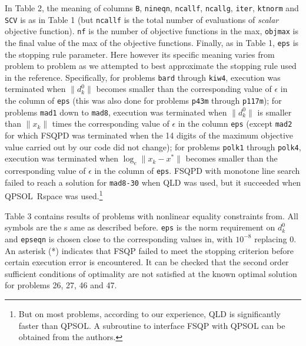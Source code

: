 In Table 2, the meaning of columns {\tt B}, {\tt nineqn}, {\tt ncallf}, 
{\tt ncallg},
{\tt iter}, {\tt ktnorm} and {\tt SCV} is as in 
Table 1 (but {\tt ncallf}
is the total number of evaluations of {\it scalar} objective function).
{\tt nf} is the number of objective functions in the max, 
{\tt objmax} is the
final value of the max of the objective functions. 
Finally, as in Table 1,
{\tt eps} is the stopping rule parameter. 
Here however its specific meaning
varies from problem to problem as we attempted to best approximate the 
stopping rule used in the reference. Specifically, 
for problems {\tt bard} through {\tt kiw4},
execution was terminated when $\|d^0_k\|$ becomes smaller 
than the corresponding value of $\epsilon$ in the column 
of {\tt eps} (this was also done for problems {\tt p43m} 
through {\tt p117m});
for problems {\tt mad1} down to {\tt mad8}, execution was
terminated when $\|d^0_k\|$ is smaller than $\|x_k\|$ times the 
corresponding value of $\epsilon$ in the column {\tt eps}
(except {\tt mad2} for which FSQPD was terminated when the 14 digits
of the maximum objective value carried out by our code did not change);
for problems {\tt polk1} through {\tt polk4}, execution 
was terminated when
$\log _e\|x_k-x^*\|$ becomes smaller than the corresponding 
value of $\epsilon$ in the column of {\tt eps}.
FSQPD with monotone line search failed to reach a solution for {\tt mad8-30}
when QLD was used, but it succeeded when QPSOL\Lspace {}\Rcitemark \
Rspace{} 
was used.\footnote{But on most problems, according to our experience,
QLD is significantly faster than QPSOL. A subroutine to interface FSQP
with QPSOL can be obtained from the authors.}

Table 3 contains results of problems with nonlinear equality
constraints from\Lspace {}\Rcitemark \Rspace{}. All symbols are the s
ame as
described before.  {\tt eps} is the norm requirement on $d_k^0$
and {\tt epseqn} is chosen close to the corresponding values 
in\Lspace {}\Rcitemark \Rspace{}, with $10^{-8}$ replacing 0. 
An asterisk (*) indicates that FSQP failed
to meet the stopping criterion before certain execution error is encountered.
It can be checked that
the second order sufficient conditions of optimality are not satisfied
at the known optimal solution for problems 26, 27, 46 and 47.


